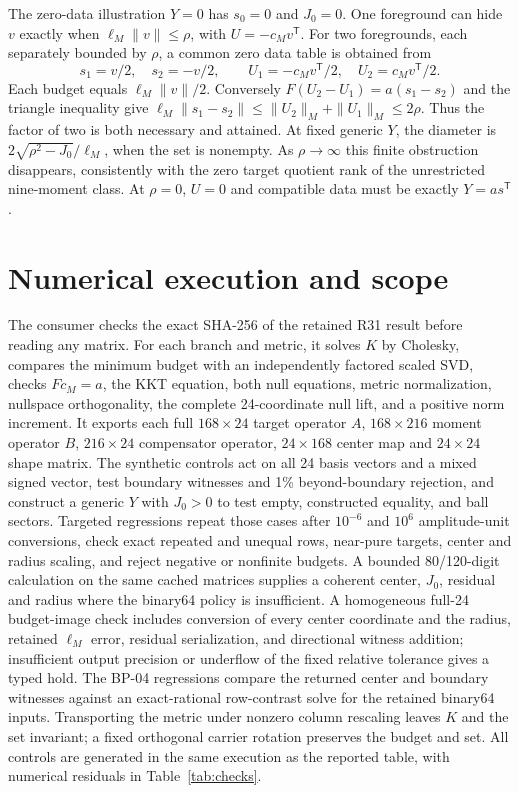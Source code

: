 \documentclass[aps,prd,onecolumn,11pt,nofootinbib,notitlepage]{revtex4-2}
\begin{document}
The zero-data illustration $Y=0$ has $s_0=0$ and $J_0=0$. One foreground can hide $v$ exactly when $\ell_M\|v\|\le\rho$, with $U=-c_Mv^{\mathsf T}$. For two foregrounds, each separately bounded by $\rho$, a common zero data table is obtained from
\begin{equation}
 s_1=v/2,\quad s_2=-v/2,\qquad
 U_1=-c_Mv^{\mathsf T}/2,\quad U_2=c_Mv^{\mathsf T}/2.
 \label{eq:pair}
\end{equation}
Each budget equals $\ell_M\|v\|/2$. Conversely $F(U_2-U_1)=a(s_1-s_2)$ and the triangle inequality give $\ell_M\|s_1-s_2\|\le\|U_2\|_M+\|U_1\|_M\le2\rho$. Thus the factor of two is both necessary and attained. At fixed generic $Y$, the diameter is $2\sqrt{\rho^2-J_0}/\ell_M$, when the set is nonempty. As $\rho\to\infty$ this finite obstruction disappears, consistently with the zero target quotient rank of the unrestricted nine-moment class. At $\rho=0$, $U=0$ and compatible data must be exactly $Y=a s^{\mathsf T}$.

\section{Numerical execution and scope}

The consumer checks the exact SHA-256 of the retained R31 result before reading any matrix. For each branch and metric, it solves $K$ by Cholesky, compares the minimum budget with an independently factored scaled SVD, checks $Fc_M=a$, the KKT equation, both null equations, metric normalization, nullspace orthogonality, the complete 24-coordinate null lift, and a positive norm increment. It exports each full $168\times24$ target operator $A$, $168\times216$ moment operator $B$, $216\times24$ compensator operator, $24\times168$ center map and $24\times24$ shape matrix. The synthetic controls act on all 24 basis vectors and a mixed signed vector, test boundary witnesses and 1\% beyond-boundary rejection, and construct a generic $Y$ with $J_0>0$ to test empty, constructed equality, and ball sectors. Targeted regressions repeat those cases after $10^{-6}$ and $10^6$ amplitude-unit conversions, check exact repeated and unequal rows, near-pure targets, center and radius scaling, and reject negative or nonfinite budgets. A bounded 80/120-digit calculation on the same cached matrices supplies a coherent center, $J_0$, residual and radius where the binary64 policy is insufficient. A homogeneous full-24 budget-image check includes conversion of every center coordinate and the radius, retained $\ell_M$ error, residual serialization, and directional witness addition; insufficient output precision or underflow of the fixed relative tolerance gives a typed hold. The BP-04 regressions compare the returned center and boundary witnesses against an exact-rational row-contrast solve for the retained binary64 inputs. Transporting the metric under nonzero column rescaling leaves $K$ and the set invariant; a fixed orthogonal carrier rotation preserves the budget and set. All controls are generated in the same execution as the reported table, with numerical residuals in Table~\ref{tab:checks}.
\end{document}
